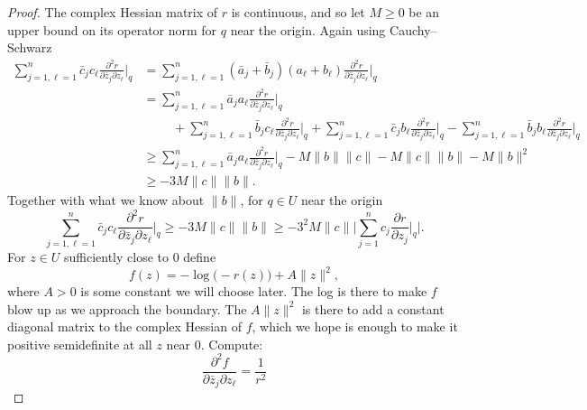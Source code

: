 \documentclass[12pt,openany]{book}
\newcommand{\snorm}[1]{\lVert {#1} \rVert}
\newcommand{\Babs}[1]{\Bigl\lvert {#1} \Bigr\rvert}
\newcommand{\BBabs}[1]{\Biggl\lvert {#1} \Biggr\rvert}
\theoremstyle{plain}
\theoremstyle{remark}
\theoremstyle{definition}
\theoremstyle{exercise}
\theoremstyle{example}
\begin{document}
\begin{proof}
\pagebreak[1]
The complex Hessian matrix of $r$ is continuous, and so let
$M \geq 0$ be an upper bound on its operator norm for $q$ near the origin.
Again using Cauchy--Schwarz
\begin{equation*}
\begin{split}
\sum_{j=1,\ell=1}^n
\bar{c}_j c_\ell \frac{\partial^2 r}{\partial \bar{z}_j \partial z_\ell} \Big|_q 
& =
\sum_{j=1,\ell=1}^n
( \bar{a}_j + \bar{b}_j )  (a_\ell + b_\ell) \frac{\partial^2 r}{\partial \bar{z}_j \partial z_\ell} \Big|_q 
\\
& =
\sum_{j=1,\ell=1}^n
\bar{a}_j a_\ell \frac{\partial^2 r}{\partial \bar{z}_j \partial z_\ell} \Big|_q 
\\
& \phantom{=} \quad
+
\sum_{j=1,\ell=1}^n
\bar{b}_j c_\ell \frac{\partial^2 r}{\partial \bar{z}_j \partial z_\ell} \Big|_q 
+
\sum_{j=1,\ell=1}^n
\bar{c}_j  b_\ell \frac{\partial^2 r}{\partial \bar{z}_j \partial z_\ell} \Big|_q 
-
\sum_{j=1,\ell=1}^n
\bar{b}_j  b_\ell \frac{\partial^2 r}{\partial \bar{z}_j \partial z_\ell} \Big|_q 
\\
& \geq
\sum_{j=1,\ell=1}^n
\bar{a}_j a_\ell \frac{\partial^2 r}{\partial \bar{z}_j \partial z_\ell} \Big|_q 
-
M\snorm{b}\snorm{c}
-
M\snorm{c}\snorm{b}
-
M\snorm{b}^2
\\
& \geq
-
3 M\snorm{c}\snorm{b} .
\end{split}
\end{equation*}
Together with what we know about
$\snorm{b}$, for $q \in U$ near the origin
\begin{equation*}
\sum_{j=1,\ell=1}^n
\bar{c}_j c_\ell \frac{\partial^2 r}{\partial \bar{z}_j \partial z_\ell} \Big|_q 
\geq -3M \snorm{c} \snorm{b} %
\geq
-3^2 M \snorm{c}\BBabs{\sum_{j=1}^n c_j \frac{\partial r}{\partial z_j}
\Big|_q} .
\end{equation*}
For $z \in U$ sufficiently close to $0$ define
\begin{equation*}
f(z) = -\log \bigl(-r(z)\bigr) + A \snorm{z}^2 ,
\end{equation*}
where $A > 0$ is some constant we will choose later.
The log is there to make $f$ blow up as we approach the boundary.
The $A \snorm{z}^2$ is there to add a constant diagonal matrix to the complex
Hessian of $f$, which we hope is enough to make it positive semidefinite at
all $z$ near $0$.
Compute:
\begin{equation*}
\frac{\partial^2 f}{\partial \bar{z}_j \partial z_\ell}
=
\frac{1}{r^2}

\end{equation*}
\end{proof}
\end{document}
